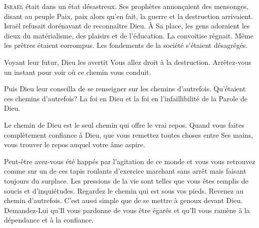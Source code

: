 

\lettrine{I}{sraël} était dans un état désastreux.
 Ses prophètes annon\c{c}aient des mensonges, disant au peuple\frcolon{} 
 \Og Paix, paix \Fg{} alors qu'en fait, la guerre et la destruction arrivaient.
 Israël refusait dorénavant de reconnaître Dieu.
 À Sa place, les gens adoraient les dieux du matérialisme, des plaisirs
 et de l'éducation. La convoitise régnait.
 Même les prêtres étaient corrompus.
 Les fondements de la société s'étaient désagrégés. 

Voyant leur futur, Dieu les avertit\frcolon{}
 \Og Vous allez droit à la destruction.
 Arrêtez-vous un instant pour voir où ce chemin vous conduit. \Fg{}

Puis Dieu leur conseilla de
 \Og se renseigner sur les chemins d'autrefois. \Fg{}
 Qu'étaient ces chemins d'autrefois? La foi en Dieu et la foi
 en l'infaillibilité de la Parole de Dieu. 


Le chemin de Dieu est le seul chemin qui offre le vrai repos.
 Quand vous faites complètement confiance à Dieu,
 que vous remettez toutes choses entre Ses mains,
 vous trouver le repos auquel votre âme aspire. 

Peut-être avez-vous été happés par l'agitation de ce monde
 et vous vous retrouvez comme sur un de ces tapis roulants d'exercice
 \ocadr marchant sans arrêt mais faisant toujours du surplace.
 Les pressions de la vie sont telles que vous êtes remplis de soucis
 et d'inquiétudes. Regardez le chemin qui est sous vos pieds.
 Revenez au chemin d'autrefois. C'est aussi simple que de se mettre
 à genoux devant Dieu. Demandez-Lui qu'Il vous pardonne de vous
 être égarés et qu'Il vous ramène à la dépendance et à la confiance. 

